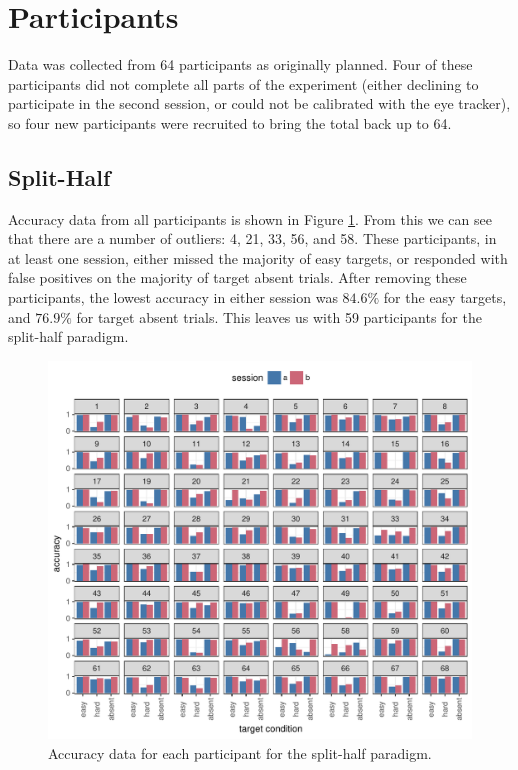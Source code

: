 \documentclass[a4paper, oneside, 11pt, onecolumn]{article}
\begin{document}

\section{Participants}

Data was collected from 64 participants as originally planned. Four of these participants did not complete all parts of the experiment (either declining to participate in the second session, or could not be calibrated with the eye tracker), so four new participants were recruited to bring the total back up to 64. 

\subsection{Split-Half}

Accuracy data from all participants is shown in Figure \ref{fig:splithalf_acc_all}. From this we can see that there are a number of outliers: 4, 21, 33, 56, and 58. These participants, in at least one session, either missed the majority of easy targets, or responded with false positives on the majority of target absent trials. After removing these participants, the lowest accuracy in either session was $84.6\%$ for the easy targets, and $76.9\%$ for target absent trials. This leaves us with 59 participants for the split-half paradigm. 

\begin{figure}
\centering
\includegraphics[width=14cm]{../Scripts/lineseg/scratch/acc_by_session_by_person.pdf}
\caption{Accuracy data for each participant for the split-half paradigm.}
\label{fig:splithalf_acc_all}
\end{figure}
\end{document}
